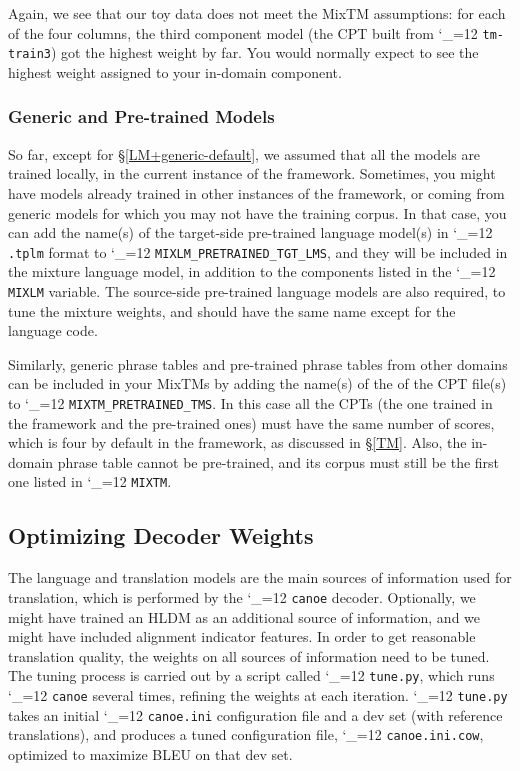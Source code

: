 \documentclass[11pt,letterpaper]{article}
\newcommand{\TODO}[1]{\emph{\textbf{\textcolor{red}{<TODO> #1 </TODO>}}}}
\def\code{\begingroup\catcode`\_=12 \codex}
\newcommand{\codex}[1]{\texttt{#1}\endgroup}
\begin{document}
Again, we see that our toy data does not meet the MixTM assumptions: for each
of the four columns, the third component model (the CPT built from
\code{tm-train3}) got the highest weight by far. You would normally expect to
see the highest weight assigned to your in-domain component.

\subsubsection{Generic and Pre-trained Models} \label{Generic}


So far, except for \S\ref{LM+generic-default}, we assumed that all the models
are trained locally, in the current instance of the framework.  Sometimes, you
might have models already trained in
other instances of the framework, or coming from generic models for which you
may not have the training corpus.  In that case, you can add the name(s) of the
target-side pre-trained language model(s) in \code{.tplm} format to
\code{MIXLM_PRETRAINED_TGT_LMS}, and they will be included in the mixture
language model, in addition to the components listed in the \code{MIXLM}
variable.  The source-side pre-trained language models are also required,
to tune the mixture weights, and should have the same name except for the
language code.


Similarly, generic phrase tables and pre-trained phrase tables from other
domains can be included in your MixTMs by adding the name(s) of the of the CPT
file(s) to \code{MIXTM_PRETRAINED_TMS}.  In this case all the CPTs (the one
trained in the framework and the pre-trained ones) must have the same number of
scores, which is four by default in the framework, as discussed in \S\ref{TM}.
Also, the in-domain phrase table cannot be pre-trained, and its corpus must
still be the first one listed in \code{MIXTM}.

\subsection{Optimizing Decoder Weights} \label{COW}

The language and translation models are the main sources of information used
for translation, which is performed by the \code{canoe} decoder.  Optionally,
we might have trained an HLDM as an additional source of information, and we
might have included alignment indicator features.  In order to get reasonable
translation quality, the weights on all sources of information
need to be tuned. The tuning process is carried out by a script called
\code{tune.py}, which runs \code{canoe} several times, refining the weights at
each iteration.  \code{tune.py} takes an initial \code{canoe.ini} configuration
file and a dev set (with reference translations), and produces a tuned
configuration file, \code{canoe.ini.cow}, optimized to maximize BLEU on that
dev set.
\end{document}
